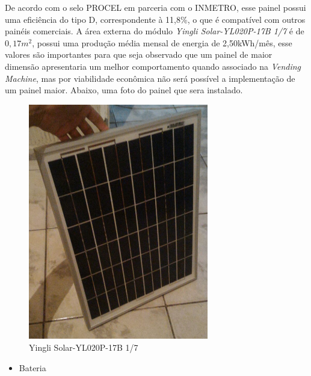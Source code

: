         	De acordo com o selo PROCEL em parceria com o INMETRO, esse painel possui uma eficiência do tipo D, correspondente à 11,8\%, o que é compatível com outros painéis comerciais.
            A área externa do módulo \textit{Yingli Solar-YL020P-17B 1/7} é de $0,17m^{2}$, possui uma produção média mensal de energia de 2,50kWh/mês, esse valores são importantes para que seja observado que um painel de maior dimensão apresentaria um melhor comportamento quando associado na \textit{Vending Machine}, mas por viabilidade econômica não será possível a implementação de um painel maior.
            Abaixo, uma foto do painel que sera instalado.

 \begin{figure}[H]
    \centering
    \includegraphics[width=0.7\textwidth]{figuras/painel_solar01}
    \caption{Yingli Solar-YL020P-17B 1/7 }
    \label{fig:painel_solar01}
\end{figure}

\begin{itemize}
\item Bateria
\end{itemize}

